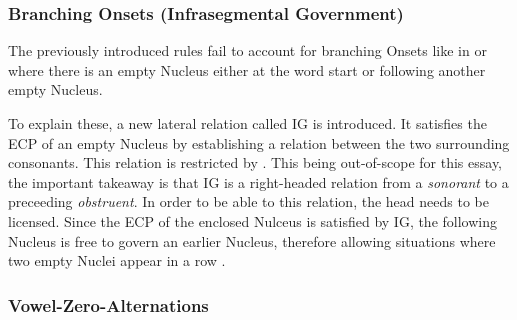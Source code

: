 \subsubsection{Branching Onsets (Infrasegmental Government)}
The previously introduced rules fail to account for branching Onsets like in
 or  where there is an empty Nucleus either at the word start or
following another empty Nucleus.

To explain these, a new lateral relation called
\gls{IG} is introduced. It satisfies the
\gls{ECP}
of an empty Nucleus by establishing a relation between the two surrounding consonants.
This relation is restricted by .
This being out-of-scope for this essay, the important takeaway is that
\gls{IG} is a right-headed relation from a \emph{sonorant} to a preceeding \emph{obstruent}.
In order to be able to  this relation, the head needs to be licensed.
Since the \gls{ECP} of the enclosed Nulceus is satisfied by \gls{IG},
the following Nucleus is free to govern an earlier Nucleus,
therefore allowing situations where two empty Nuclei appear in a row
\parencite[p.~76]{scheer2004}.

\begin{structure}{ \ti{[bKEt]}}
  \wordstart[nogov, nV=1]
  \emptyV[n=\smiley]
  \emptyV

\end{structure}

\begin{structure}{ \ti{[f@Kgl\t*{aI}ç]}}
  \wordstart
  \emptyV[n=1]
  \emptyV[n=\smiley]
  \emptyV

\end{structure}



\subsubsection{Vowel-Zero-Alternations}
\TODO{}

